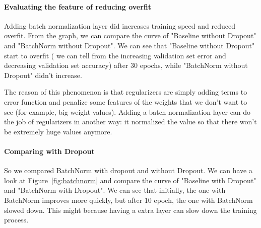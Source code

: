 \documentclass{article}
\begin{document}
\paragraph{Evaluating the feature of reducing overfit} Adding batch normalization layer did increases training speed and reduced overfit. From the graph, we can compare the curve of "Baseline without Dropout" and "BatchNorm without Dropout". We can see that "Baseline without Dropout" start to overfit ( we can tell from the increasing validation set error and decreasing validation set accuracy) after 30 epochs, while "BatchNorm without Dropout" didn't increase. 

The reason of this phenomenon is that regularizers are simply adding terms to error function and penalize some features of the weights that we don't want to see (for example, big weight values). Adding a batch normalization layer can do the job of regularizers in another way: it normalized the value so that there won't be extremely huge values anymore.


\paragraph{Comparing with Dropout} So we compared BatchNorm with dropout and without Dropout. We can have a look at Figure~\ref{fig:batchnorm} and compare the curve of "Baseline with Dropout" and "BatchNorm with Dropout". We can see that initially, the one with BatchNorm improves more quickly, but after 10 epoch, the one with BatchNorm slowed down. This might because having a extra layer can slow down the training process. %
\end{document}
